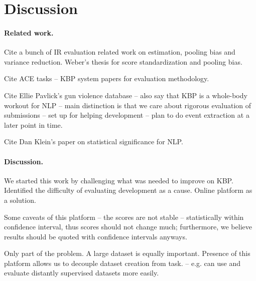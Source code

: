 \section{Discussion}
\label{sec:discussion}

\paragraph{Related work.}

Cite a bunch of IR evaluation related work on estimation, pooling bias and variance reduction. Weber's thesis for score standardization and pooling bias.

Cite ACE tasks -- KBP system papers for evaluation methodology. 

Cite Ellie Pavlick's gun violence database -- also say that KBP is a whole-body workout for NLP -- main distinction is that we care about rigorous evaluation of submissions -- set up for helping development -- plan to do event extraction at a later point in time.

Cite Dan Klein's paper on statistical significance for NLP.

\paragraph{Discussion.}

We started this work by challenging what was needed to improve on KBP.
Identified the difficulty of evaluating development as a cause.
Online platform as a solution.

Some caveats of this platform -- the scores are not stable --  statistically within confidence interval, thus scores should not change much; furthermore, we believe results should be quoted with confidence intervals anyways.

Only part of the problem.
A large dataset is equally important.
Presence of this platform allows us to decouple dataset creation from task. -- e.g. can use and evaluate distantly supervised datasets more easily.
